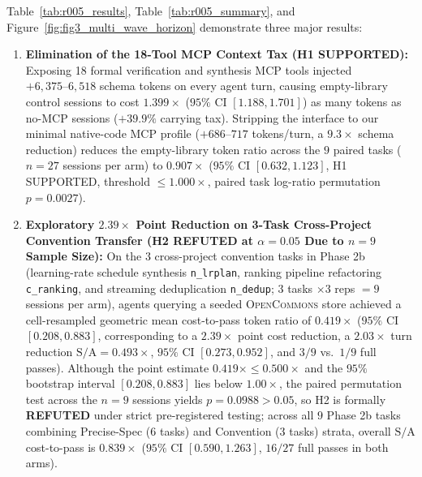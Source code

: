 \documentclass[10pt,twocolumn]{article}
\begin{document}
Table~\ref{tab:r005_results}, Table~\ref{tab:r005_summary}, and Figure~\ref{fig:fig3_multi_wave_horizon} demonstrate three major results:
\begin{enumerate}
    \item \textbf{Elimination of the 18-Tool MCP Context Tax (H1 SUPPORTED):} Exposing 18 formal verification and synthesis MCP tools injected $+6{,}375\text{--}6{,}518$ schema tokens on every agent turn, causing empty-library control sessions to cost $1.399\times$ ($95\%$ CI $[1.188, 1.701]$) as many tokens as no-MCP sessions ($+39.9\%$ carrying tax). Stripping the interface to our minimal native-code MCP profile ($+686\text{--}717$ tokens/turn, a $9.3\times$ schema reduction) reduces the empty-library token ratio across the $9$ paired tasks ($n=27$ sessions per arm) to $0.907\times$ ($95\%$ CI $[0.632, 1.123]$, H1 SUPPORTED, threshold $\le 1.000\times$, paired task log-ratio permutation $p = 0.0027$).
    \item \textbf{Exploratory $2.39\times$ Point Reduction on 3-Task Cross-Project Convention Transfer (H2 REFUTED at $\alpha = 0.05$ Due to $n=9$ Sample Size):} On the $3$ cross-project convention tasks in Phase 2b (learning-rate schedule synthesis \texttt{n\_lrplan}, ranking pipeline refactoring \texttt{c\_ranking}, and streaming deduplication \texttt{n\_dedup}; $3$ tasks $\times 3$ reps $= 9$ sessions per arm), agents querying a seeded \textsc{OpenCommons} store achieved a cell-resampled geometric mean cost-to-pass token ratio of $0.419\times$ ($95\%$ CI $[0.208, 0.883]$, corresponding to a $2.39\times$ point cost reduction, a $2.03\times$ turn reduction $\text{S/A} = 0.493\times$, $95\%$ CI $[0.273, 0.952]$, and $3/9$ vs.\ $1/9$ full passes). Although the point estimate $0.419\times \le 0.500\times$ and the $95\%$ bootstrap interval $[0.208, 0.883]$ lies below $1.00\times$, the paired permutation test across the $n=9$ sessions yields $p = 0.0988 > 0.05$, so H2 is formally \textbf{REFUTED} under strict pre-registered testing; across all $9$ Phase 2b tasks combining Precise-Spec ($6$ tasks) and Convention ($3$ tasks) strata, overall $\text{S/A}$ cost-to-pass is $0.839\times$ ($95\%$ CI $[0.590, 1.263]$, $16/27$ full passes in both arms).

\end{enumerate}
\end{document}
